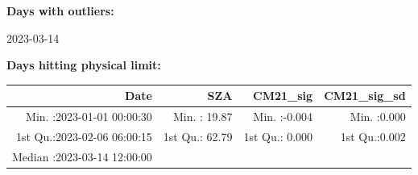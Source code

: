 \documentclass[
  10pt,
  a4paper,oneside]{article}
\begin{document}
\normalsize

\textbf{Days with outliers:}

2023-03-14

\textbf{Days hitting physical limit:}

\footnotesize

\begin{longtable}[]{@{}rrrr@{}}
\toprule
\begin{minipage}[b]{0.33\columnwidth}\raggedleft
Date\strut
\end{minipage} & \begin{minipage}[b]{0.19\columnwidth}\raggedleft
SZA\strut
\end{minipage} & \begin{minipage}[b]{0.19\columnwidth}\raggedleft
CM21\_sig\strut
\end{minipage} & \begin{minipage}[b]{0.19\columnwidth}\raggedleft
CM21\_sig\_sd\strut
\end{minipage}\tabularnewline
\midrule
\endhead
\begin{minipage}[t]{0.33\columnwidth}\raggedleft
Min. :2023-01-01 00:00:30\strut
\end{minipage} & \begin{minipage}[t]{0.19\columnwidth}\raggedleft
Min. : 19.87\strut
\end{minipage} & \begin{minipage}[t]{0.19\columnwidth}\raggedleft
Min. :-0.004\strut
\end{minipage} & \begin{minipage}[t]{0.19\columnwidth}\raggedleft
Min. :0.000\strut
\end{minipage}\tabularnewline
\begin{minipage}[t]{0.33\columnwidth}\raggedleft
1st Qu.:2023-02-06 06:00:15\strut
\end{minipage} & \begin{minipage}[t]{0.19\columnwidth}\raggedleft
1st Qu.: 62.79\strut
\end{minipage} & \begin{minipage}[t]{0.19\columnwidth}\raggedleft
1st Qu.: 0.000\strut
\end{minipage} & \begin{minipage}[t]{0.19\columnwidth}\raggedleft
1st Qu.:0.002\strut
\end{minipage}\tabularnewline
\begin{minipage}[t]{0.33\columnwidth}\raggedleft
Median :2023-03-14 12:00:00\strut
\end{minipage} & \begin{minipage}[t]{0.19\columnwidth}\raggedleft

\end{minipage}
\end{longtable}
\end{document}
